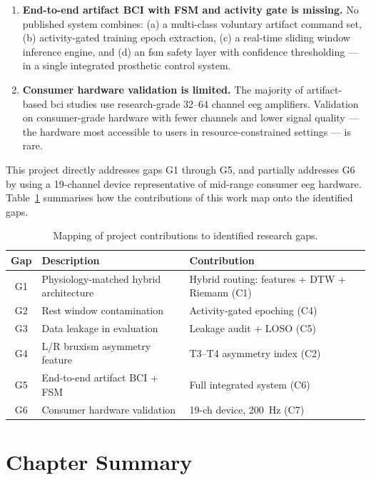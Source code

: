 \begin{enumerate}[leftmargin=*, label=\textbf{G\arabic*.}]
    \item \textbf{End-to-end artifact BCI with FSM and activity
    gate is missing.} No published system combines: (a) a
    multi-class voluntary artifact command set, (b) activity-gated
    training epoch extraction, (c) a real-time sliding window
    inference engine, and (d) an \acrshort{fsm} safety layer with
    confidence thresholding — in a single integrated prosthetic
    control system.

    \item \textbf{Consumer hardware validation is limited.} The
    majority of artifact-based \acrshort{bci} studies use
    research-grade 32--64 channel \acrshort{eeg} amplifiers.
    Validation on consumer-grade hardware with fewer channels
    and lower signal quality — the hardware most accessible to
    users in resource-constrained settings — is rare.

\end{enumerate}

This project directly addresses gaps G1 through G5, and partially
addresses G6 by using a 19-channel device representative of
mid-range consumer \acrshort{eeg} hardware. Table~\ref{tab:gap_positioning}
summarises how the contributions of this work map onto the
identified gaps.

\begin{table}[htbp]
\centering
\caption{Mapping of project contributions to identified research
gaps.}
\label{tab:gap_positioning}
\renewcommand{\arraystretch}{1.3}
\begin{tabular}{c p{4.5cm} p{4.0cm}}
\toprule
\textbf{Gap} & \textbf{Description} & \textbf{Contribution} \\
\midrule
G1 & Physiology-matched hybrid architecture & Hybrid routing: features + DTW + Riemann (C1) \\
G2 & Rest window contamination & Activity-gated epoching (C4) \\
G3 & Data leakage in evaluation & Leakage audit + LOSO (C5) \\
G4 & L/R bruxism asymmetry feature & T3--T4 asymmetry index (C2) \\
G5 & End-to-end artifact BCI + FSM & Full integrated system (C6) \\
G6 & Consumer hardware validation & 19-ch device, 200~Hz (C7) \\
\bottomrule
\end{tabular}
\end{table}

\section{Chapter Summary}
\label{sec:rw_summary}

